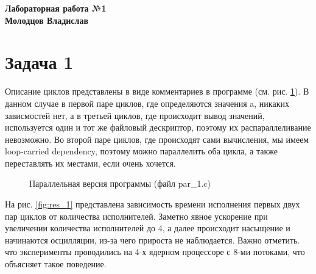 \documentclass[a4paper,12pt]{article} %
\begin{document}
\begin{center}
\bf Лабораторная работа №1 \\
Молодцов Владислав
\end{center}

\section{Задача 1}

Описание циклов представлены в виде комментариев в программе (см. рис. \ref{fig:program_1}).
В данном случае в первой паре циклов, где определяются значения a, никаких зависмостей нет, а в третьей циклов, где происходит вывод значений, используется один и тот же файловый дескриптор, поэтому
их распараллеливание невозможно.
Во второй паре циклов, где происходят сами вычисления, мы имеем loop-carried dependency, поэтому можно параллелить оба цикла, а также переставлять их местами, если очень хочется.

\begin{figure}[h!]
	\caption{Параллельная версия программы (файл par\_1.c)}
	\label{fig:program_1}
\end{figure}

\newpage
На рис. \ref{fig:res_1} представлена зависимость времени исполнения первых двух пар циклов от количества исполнителей.
Заметно явное ускорение при увеличении количества исполнителей до 4, а далее
происходит насыщение и начинаются осцилляции, из-за чего прироста не наблюдается. Важно отметить. что эксперименты проводились на 4-х ядерном процессоре с 8-ми потоками, что объясняет такое поведение.
\end{document}
